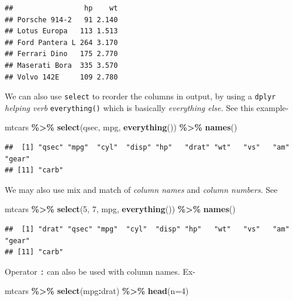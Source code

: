\documentclass[
]{book}
\newenvironment{Shaded}{\begin{snugshade}}{\end{snugshade}}
\newcommand{\AttributeTok}[1]{\textcolor[rgb]{0.13,0.29,0.53}{#1}}
\newcommand{\DecValTok}[1]{\textcolor[rgb]{0.00,0.00,0.81}{#1}}
\newcommand{\FunctionTok}[1]{\textcolor[rgb]{0.13,0.29,0.53}{\textbf{#1}}}
\newcommand{\NormalTok}[1]{#1}
\newcommand{\SpecialCharTok}[1]{\textcolor[rgb]{0.81,0.36,0.00}{\textbf{#1}}}
\begin{document}
\begin{verbatim}
##                 hp    wt
## Porsche 914-2   91 2.140
## Lotus Europa   113 1.513
## Ford Pantera L 264 3.170
## Ferrari Dino   175 2.770
## Maserati Bora  335 3.570
## Volvo 142E     109 2.780
\end{verbatim}

We can also use \texttt{select} to reorder the columns in output, by using a \texttt{dplyr} \emph{helping verb} \texttt{everything()} which is basically \emph{everything else.} See this example-

\begin{Shaded}
\begin{Highlighting}[]
\NormalTok{mtcars }\SpecialCharTok{\%\textgreater{}\%} 
  \FunctionTok{select}\NormalTok{(qsec, mpg, }\FunctionTok{everything}\NormalTok{()) }\SpecialCharTok{\%\textgreater{}\%} 
  \FunctionTok{names}\NormalTok{()}
\end{Highlighting}
\end{Shaded}

\begin{verbatim}
##  [1] "qsec" "mpg"  "cyl"  "disp" "hp"   "drat" "wt"   "vs"   "am"   "gear"
## [11] "carb"
\end{verbatim}

We may also use mix and match of \emph{column names} and \emph{column numbers}. See

\begin{Shaded}
\begin{Highlighting}[]
\NormalTok{mtcars }\SpecialCharTok{\%\textgreater{}\%} 
  \FunctionTok{select}\NormalTok{(}\DecValTok{5}\NormalTok{, }\DecValTok{7}\NormalTok{, mpg, }\FunctionTok{everything}\NormalTok{()) }\SpecialCharTok{\%\textgreater{}\%} 
  \FunctionTok{names}\NormalTok{()}
\end{Highlighting}
\end{Shaded}

\begin{verbatim}
##  [1] "drat" "qsec" "mpg"  "cyl"  "disp" "hp"   "wt"   "vs"   "am"   "gear"
## [11] "carb"
\end{verbatim}

Operator \texttt{:} can also be used with column names. Ex-

\begin{Shaded}
\begin{Highlighting}[]
\NormalTok{mtcars }\SpecialCharTok{\%\textgreater{}\%} 
  \FunctionTok{select}\NormalTok{(mpg}\SpecialCharTok{:}\NormalTok{drat) }\SpecialCharTok{\%\textgreater{}\%} 
  \FunctionTok{head}\NormalTok{(}\AttributeTok{n=}\DecValTok{4}\NormalTok{)}
\end{Highlighting}
\end{Shaded}
\end{document}
